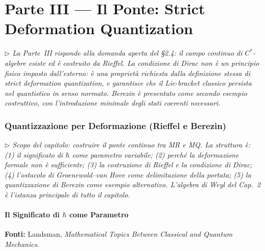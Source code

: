 \documentclass[12pt, a4paper]{article}
\newcommand{\fonti}[1]{%
	\begin{fontebox}
		\textcolor{fontecolor}{\footnotesize\textbf{Fonti:} #1}
	\end{fontebox}%
}
\newcommand{\nota}[1]{%
	\par\smallskip
	\noindent\textit{\small $\triangleright$\; #1}
	\par\smallskip
}
\begin{document}
	\newpage
	\part*{Parte III --- Il Ponte: Strict Deformation Quantization}
	
	\nota{La Parte~III risponde alla domanda aperta del §2.4: il campo continuo di
		$C^*$-algebre esiste ed è costruito da Rieffel. La condizione di Dirac non è
		un principio fisico imposto dall'esterno: è una proprietà richiesta dalla definizione
		stessa di strict deformation quantization, e garantisce che il Lie-bracket classico
		persista nel quantistico in senso normato. Berezin è presentato come secondo esempio
		costruttivo, con l'introduzione minimale degli stati coerenti necessari.}
	
	\section{Quantizzazione per Deformazione (Rieffel e Berezin)}
	
	\nota{Scopo del capitolo: costruire il ponte continuo tra MR e MQ. La struttura è:
		(1) il significato di $\hbar$ come parametro variabile; (2) perché la deformazione
		formale non è sufficiente; (3) la costruzione di Rieffel e la condizione di Dirac;
		(4) l'ostacolo di Groenewold--van Hove come delimitazione della portata; (5) la
		quantizzazione di Berezin come esempio alternativo. L'algebra di Weyl del Cap.\ 2
		è l'istanza principale di tutto il capitolo.}
	
	\subsection{Il Significato di $\hbar$ come Parametro}
	
	\fonti{Landsman, \textit{Mathematical Topics Between Classical and Quantum Mechanics}.}
	
\end{document}
